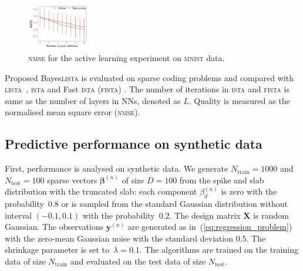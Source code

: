 \documentclass{article}
\begin{document}
    \begin{figure}[!t]
  \centering
  \includegraphics[width=0.24\textwidth]{graphics/active_mnist/nmse_validation}
  \caption{\textsc{nmse} for the active learning experiment on \textsc{mnist} data. }
  \label{fig:active_learning_mnist}
  \end{figure}
  
  Proposed Bayes\textsc{lista} is evaluated on sparse coding problems and compared with \textsc{lista}~\cite{gregor2010learning}, \textsc{ista} \cite{daubechies2004iterative} and Fast \textsc{ista} (\textsc{fista}) \cite{beck2009fast}. The number of iterations in \textsc{ista} and \textsc{fista} is same as the number of layers in NNs, denoted as $L$. Quality is measured as the normalised mean square error (\textsc{nmse}). %
  
  \subsection{Predictive performance on synthetic data}
  First, performance is analysed on synthetic data. We generate $N_\text{train}=1000$ and $N_{\text{test}} = 100$ sparse vectors $\boldsymbol\beta^{(n)}$ of size $D = 100$  from the spike and slab distribution with the truncated slab: each component $\beta^{(n)}_{d}$ is zero with the probability~$0.8$ or is sampled from the standard Gaussian distribution without interval $(-0.1, 0.1)$ with the probability~$0.2$. The design matrix $\mathbf{X}$ is random Gaussian.  The observations $\mathbf{y}^{(n)}$ are generated as in~(\ref{eq:regression_problem}) with the zero-mean Gaussian noise with the standard deviation $0.5$. The shrinkage parameter is set to~$\lambda = 0.1$. The algorithms are trained on the training data of size $N_\text{train}$ and evaluated on the test data of size $N_{\text{test}}$.
  
\end{document}
